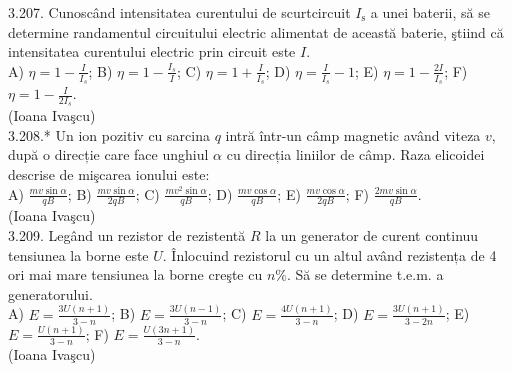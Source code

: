 3.207. Cunoscând intensitatea curentului de scurtcircuit $I_{\mathrm{s}}$ a unei baterii, să se determine randamentul circuitului electric alimentat de această baterie, ştiind că intensitatea curentului electric prin circuit este $I$.\\ A) $\eta=1-\frac{I}{I_{s}}$; B) $\eta=1-\frac{I_{s}}{I}$; C) $\eta=1+\frac{I}{I_{s}}$; D) $\eta=\frac{I}{I_{s}}-1$; E) $\eta=1-\frac{2 I}{I_{s}}$; F) $\eta=1-\frac{I}{2 I_{s}}$.\\ (Ioana Ivaşcu)\\

3.208.* Un ion pozitiv cu sarcina $q$ intră într-un câmp magnetic având viteza $v$, după o direcție care face unghiul $\alpha$ cu direcția liniilor de câmp. Raza elicoidei descrise de mişcarea ionului este:\\ A) $\frac{m v \sin \alpha}{q B}$; B) $\frac{m v \sin \alpha}{2 q B}$; C) $\frac{m v^{2} \sin \alpha}{q B}$; D) $\frac{m v \cos \alpha}{q B}$; E) $\frac{m v \cos \alpha}{2 q B}$; F) $\frac{2 m v \sin \alpha}{q B}$.\\ (Ioana Ivaşcu)\\

3.209. Legând un rezistor de rezistentă $R$ la un generator de curent continuu tensiunea la borne este $U$. Înlocuind rezistorul cu un altul având rezistența de 4 ori mai mare tensiunea la borne creşte cu $n \%$. Să se determine t.e.m. a generatorului.\\ A) $E=\frac{3 U(n+1)}{3-n}$; B) $E=\frac{3 U(n-1)}{3-n}$; C) $E=\frac{4 U(n+1)}{3-n}$; D) $E=\frac{3 U(n+1)}{3-2 n}$; E) $E=\frac{U(n+1)}{3-n}$; F) $E=\frac{U(3 n+1)}{3-n}$.\\ (Ioana Ivaşcu)\\

